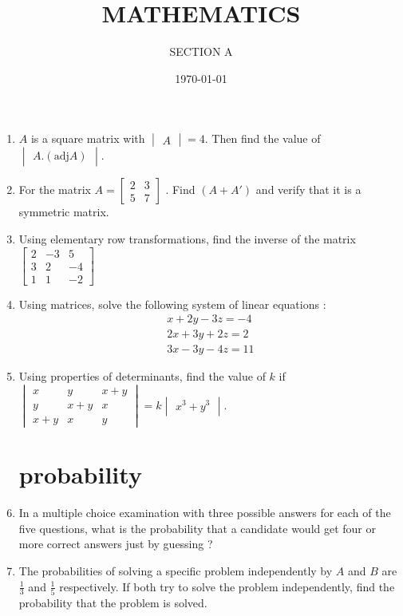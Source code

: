 \documentclass[10pt,-letter paper]{article}
\title{MATHEMATICS}
\author{SECTION A}
\date{\today}
\providecommand{\mydet}[1]{\ensuremath{\begin{vmatrix}#1\end{vmatrix}}}
\providecommand{\myvec}[1]{\ensuremath{\begin{bmatrix}#1\end{bmatrix}}}
\providecommand{\brak}[1]{\ensuremath{\left(#1\right)}}
\begin{document}
\maketitle

\begin{enumerate}
\section{Matrices}
\item $ A $ is a square matrix with $\mydet{A} = 4 $. Then find the value of  $\mydet{ A .\brak{\text{adj} A}}$.

\item For the matrix $A = \myvec{2 & 3  \\ 5 & 7} $ . Find $\brak{A + A'}$ and verify that it is a symmetric matrix.

\item Using elementary row transformations, find the inverse of the matrix
$\myvec{2 & -3 &5 \\ 3 & 2 & -4 \\ 1 & 1 & -2}$ 


\item Using matrices, solve the following system of linear equations :
\begin{align*}
 x+2y-3z=-4\\
 2x+3y+2z=2\\
 3x-3y-4z=11
\end{align*}


\item Using properties of determinants, find the value of $k $ if
$\mydet{x & y & x+y \\ y & x+y & x \\ x+y & x & y} =k\mydet{x^{3}+y^{3}}$.


\section{probability}
\item In a multiple choice examination with three possible answers for each of the five questions, what is the probability that a candidate would get four or more correct answers just by guessing ?

\item The probabilities of solving a specific problem independently by $A$ and $B$ are $\frac{1}{3}$ and $\frac{1}{5}$ respectively. If both try to solve the problem independently, find the probability that the problem is solved.


\end{enumerate}
\end{document}
